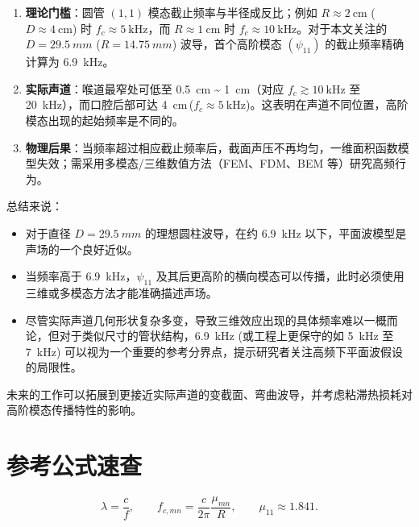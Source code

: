 \documentclass[12pt,a4paper]{article}
\begin{document}
\begin{enumerate}
    \item \textbf{理论门槛}：圆管 $(1,1)$ 模态截止频率与半径成反比；例如 $R\approx\SI{2}{\centi\meter}$ ($D\approx\SI{4}{\centi\meter}$) 时 $f_c\approx\SI{5}{\kilo\hertz}$，而 $R\approx\SI{1}{\centi\meter}$ 时 $f_c\approx\SI{10}{\kilo\hertz}$。对于本文关注的 $D=\SI{29.5}{mm}$ ($R=\SI{14.75}{mm}$) 波导，首个高阶模态 $(\psi_{11})$ 的截止频率精确计算为 \SI{6.9}{kHz}。
    \item \textbf{实际声道}：喉道最窄处可低至 \SI{0.5}{\centi\meter} \textasciitilde{} \SI{1}{\centi\meter}（对应 $f_c\gtrsim\SI{10}{\kilo\hertz}$ 至 \SI{20}{\kilo\hertz}），而口腔后部可达 \SI{4}{\centi\meter}$\,$($f_c\approx\SI{5}{\kilo\hertz}$)。这表明在声道不同位置，高阶模态出现的起始频率是不同的。
    \item \textbf{物理后果}：当频率超过相应截止频率后，截面声压不再均匀，一维面积函数模型失效；需采用多模态/三维数值方法（FEM、FDM、BEM 等）研究高频行为。
\end{enumerate}

总结来说：
\begin{itemize}
    \item 对于直径 $D=\SI{29.5}{mm}$ 的理想圆柱波导，在约 \SI{6.9}{kHz} 以下，平面波模型是声场的一个良好近似。
    \item 当频率高于 \SI{6.9}{kHz}，$\psi_{11}$ 及其后更高阶的横向模态可以传播，此时必须使用三维或多模态方法才能准确描述声场。
    \item 尽管实际声道几何形状复杂多变，导致三维效应出现的具体频率难以一概而论，但对于类似尺寸的管状结构，\SI{6.9}{kHz} (或工程上更保守的如 \SI{5}{\kilo\hertz} 至 \SI{7}{\kilo\hertz}) 可以视为一个重要的参考分界点，提示研究者关注高频下平面波假设的局限性。
\end{itemize}
未来的工作可以拓展到更接近实际声道的变截面、弯曲波导，并考虑粘滞热损耗对高阶模态传播特性的影响。

\section{参考公式速查}

\[
    \boxed{\lambda = \dfrac{c}{f}}, \qquad
    \boxed{f_{c,mn} = \dfrac{c}{2\pi}\dfrac{\mu_{mn}}{R}}, \qquad
    \boxed{\mu_{11}\approx1.841}.
\]

\end{document}
